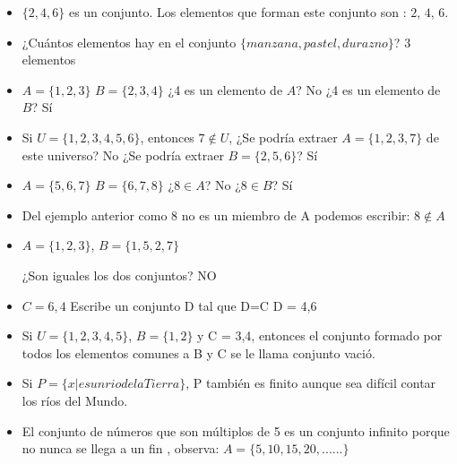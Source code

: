 \documentclass[12pt, a5paper]{article}
\begin{document}
\begin{itemize}
\item {$\{2, 4, 6\}$ es un conjunto. Los elementos que forman este conjunto son : $2$, $4$, $6$.}

\item {¿Cuántos elementos hay en el conjunto $\{ manzana, pastel, durazno\}$? 3 elementos}

\item {$A = \{1, 2, 3 \}$ $B = \{2, 3, 4 \}$ ¿4 es un elemento de $A$? No
¿4 es un elemento de $B$? Sí }

\item {Si $U = \{ 1, 2, 3, 4, 5, 6 \}$, entonces $7 \notin U$,
¿Se podría extraer $A = \{ 1, 2, 3, 7 \}$ de este universo? No ¿Se podría extraer $B = \{ 2, 5 , 6 \}$? Sí }

\item{$A = \{5, 6, 7 \}$ $B = \{6, 7, 8 \}$  ¿$8 \in A$? No ¿$8 \in B$? Sí}

\item{Del ejemplo anterior como 8 no es un miembro de A podemos escribir:
$8 \notin A$}

\item{$A= \{ 1, 2, 3 \}$, $B = \{ 1, 5, 2, 7 \}$


¿Son iguales los dos conjuntos? NO
}
\item{$C = {6, 4}$ Escribe un conjunto D tal que D=C D = {4,6}}
\item{Si $U = \{ 1, 2, 3, 4, 5 \}$, $B = \{ 1, 2 \}$ y C = {3,4}, entonces el conjunto formado por todos los elementos comunes a B y C se le llama conjunto vació.}
\item{Si $P = \{ x | es un rio de la Tierra \}$, P también es finito aunque sea difícil contar los ríos del Mundo.}
\item{El conjunto de números que son múltiplos de 5 es un conjunto infinito porque no nunca se llega a un fin , observa: $A = \{ 5, 10, 15,  20, ...... \}$

}
\end{itemize}
\end{document}
